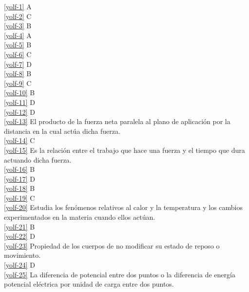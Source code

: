 \noindent \ref{yolf-1} A\\
\ref{yolf-2} C\\
\ref{yolf-3} B\\
\ref{yolf-4} A\\
\ref{yolf-5} B\\
\ref{yolf-6} C\\
\ref{yolf-7} D\\
\ref{yolf-8} B\\
\ref{yolf-9} C\\
\ref{yolf-10} B\\
\ref{yolf-11} D\\
\ref{yolf-12} D\\
\ref{yolf-13} El producto de la fuerza neta paralela al plano de aplicación por la distancia en la cual actúa dicha fuerza.\\
\ref{yolf-14} C\\
\ref{yolf-15} Es la relación entre el trabajo que hace una fuerza y el tiempo que dura actuando dicha fuerza.\\
\ref{yolf-16} B\\
\ref{yolf-17} D\\
\ref{yolf-18} B\\
\ref{yolf-19} C\\
\ref{yolf-20} Estudia los fenómenos relativos al calor y la temperatura y los cambios experimentados en la materia cuando ellos actúan.\\
\ref{yolf-21} B\\
\ref{yolf-22} D\\
\ref{yolf-23} Propiedad de los cuerpos de no modificar su estado de reposo o movimiento.\\
\ref{yolf-24} D\\
\ref{yolf-25} La diferencia de potencial entre dos puntos o la diferencia de energía potencial eléctrica por unidad de carga entre dos puntos.\\



